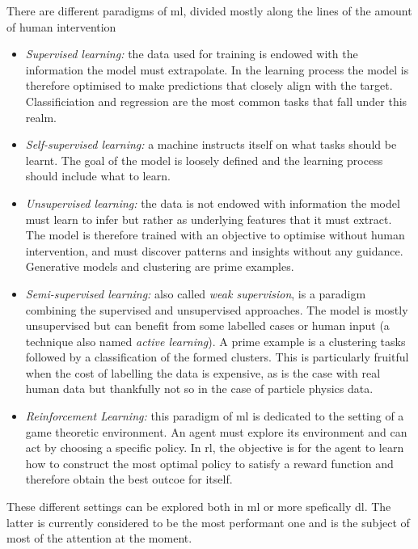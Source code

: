 There are different paradigms of \gls{ml}, divided mostly along the lines of the amount of human intervention \cite{MurphyML:}
\begin{itemize}
    \item \textit{Supervised learning:} the data used for training is endowed with the information the model must extrapolate. In the learning process the model is therefore optimised to make predictions that closely align with the target. Classificiation and regression are the most common tasks that fall under this realm.
    \item \textit{Self-supervised learning:} a machine instructs itself on what tasks should be learnt. The goal of the model is loosely defined and the learning process should include what to learn.
    \item \textit{Unsupervised learning:} the data is not endowed with information the model must learn to infer but rather as underlying features that it must extract. The model is therefore trained with an objective to optimise without human intervention, and must discover patterns and insights without any guidance. Generative models and clustering are prime examples. 
    \item \textit{Semi-supervised learning:} also called \textit{weak supervision}, is a paradigm combining the supervised and unsupervised approaches. The model is mostly unsupervised but can benefit from some labelled cases or human input (a technique also named \textit{active learning}). A prime example is a clustering tasks followed by a classification of the formed clusters. This is particularly fruitful when the cost of labelling the data is expensive, as is the case with real human data but thankfully not so in the case of particle physics data.
    \item\textit{Reinforcement Learning:} this paradigm of \gls{ml} is dedicated to the setting of a game theoretic environment. An agent must explore its environment and can act by choosing a specific policy. In \gls{rl}, the objective is for the agent to learn how to construct the most optimal policy to satisfy a reward function and therefore obtain the best outcoe for itself.
\end{itemize}

These different settings can be explored both in \gls{ml} or more spefically \gls{dl}. The latter is currently considered to be the most performant one and is the subject of most of the attention at the moment.

